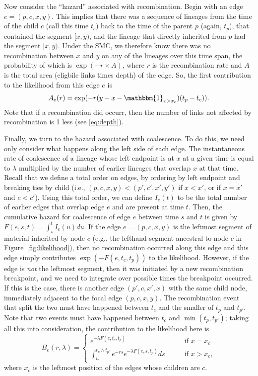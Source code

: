 \documentclass{article}
\begin{document}
Now consider the ``hazard'' associated with recombination.
Begin with an edge $e = (p,c,x,y)$.
This implies that there was a sequence of lineages
from the time of the child $c$ (call this time $t_c$)
back to the time of the parent $p$ (again, $t_p$),
that contained the segment $[x,y)$,
and the lineage that directly inherited from $p$
had the segment $[x,y)$.
Under the SMC,
we therefore know there was no recombination between $x$ and $y$
on any of the lineages 
over this time span,
the probability of which is
$\exp(-r \times A)$, where $r$ is the recombination rate
and $A$ is the total area (eligbile links times depth) of the edge.
So, the first contribution to the likelihood from this edge $e$ is
\begin{equation}\label{eq:span}
A_e(r) = \exp(-r (y-x - \mathbbm{1}_{x > x_c})(t_p - t_{c})) .
\end{equation}
Note that if a recombination did occurr, then the number of links not
affected by recombination is 1 less (see \ref{eq:depth}).

Finally, we turn to the hazard associated with coalescence.
To do this, we need only consider what happens along the left side
of each edge.
The instantaneous rate of coalescence of a lineage whose left endpoint is at $x$
at a given time is equal to $\lambda$ multiplied
by the number of earlier lineages that overlap $x$ at that time.
Recall that we define a total order on edges,
by ordering by left endpoint and breaking ties by child
(i.e., $(p,c,x,y) < (p',c',x',y')$
if $x<x'$, or if $x=x'$ and $c<c'$).
Using this total order, we can define
$I_e(t)$ to be the total number of earlier edges that overlap edge $e$
and are present at time $t$.
Then, the cumulative hazard for coalescence of edge $e$
between time $s$ and $t$ is given by $F(e, s, t) = \int_{s}^{t} I_{e}(u) du$.
If the edge $e = (p,c,x,y)$
is the leftmost segment of material inherited by node $c$
(e.g., the lefthand segment ancestral to node $c$
in Figure~\ref{fig:likelihood}),
then no recombination occurred along this edge and 
this edge simply contributes $\exp(-F(e,t_c,t_p))$ to the likelihood.
However, if the edge is \emph{not} the leftmost segment,
then it was initiated by a new recombination breakpoint,
and we need to integrate over possible times the breakpoint occurred.
If this is the case, there is another edge $(p',c,x',x)$ with the same child node,
immediately adjacent to the focal edge $(p,c,x,y)$.
The recombination event that split the two must have happened between $t_c$
and the smaller of $t_p$ and $t_{p'}$. Note that two events must have happened
between $t_c$ and $\min(t_p, t_{p'})$; taking all this into consideration,
the contribution to the likelihood here is
\begin{equation}\label{eq:depth}
B_e(r, \lambda) = \begin{cases}
    e^{-\lambda F(e, t_c, t_p)}
        & \qquad \text{if } x=x_{c} \\
    \int_{t_c}^{t_{p} \wedge t_{p'}} e^{- r s} e^{-\lambda F(e, s, t_{p})} ds
        & \qquad \text{if } x>x_{c} ,
\end{cases}
\end{equation}
where $x_c$ is the leftmost position of the edges whose children are $c$.
\end{document}
